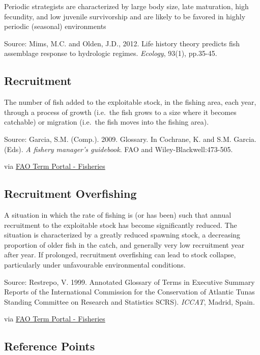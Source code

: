 \documentclass[
  11pt,
]{book}
\begin{document}
Periodic strategists are characterized by large body size, late maturation, high fecundity, and low juvenile survivorship and are likely to be favored in highly periodic (seasonal) environments

Source: Mims, M.C. and Olden, J.D., 2012. Life history theory predicts fish assemblage response to hydrologic regimes. \emph{Ecology}, 93(1), pp.35-45.

\hypertarget{recruitment}{%
\subsection{Recruitment}\label{recruitment}}

The number of fish added to the exploitable stock, in the fishing area, each year, through a process of growth (i.e.~the fish grows to a size where it becomes catchable) or migration (i.e.~the fish moves into the fishing area).

Source: Garcia, S.M. (Comp.). 2009. Glossary. In Cochrane, K. and S.M. Garcia. (Eds). \emph{A fishery manager's guidebook}. FAO and Wiley-Blackwell:473-505.

via \href{http://www.fao.org/fishery/glossary/en}{FAO Term Portal - Fisheries}

\hypertarget{recruitment-overfishing}{%
\subsection{Recruitment Overfishing}\label{recruitment-overfishing}}

A situation in which the rate of fishing is (or has been) such that annual recruitment to the exploitable stock has become significantly reduced. The situation is characterized by a greatly reduced spawning stock, a decreasing proportion of older fish in the catch, and generally very low recruitment year after year. If prolonged, recruitment overfishing can lead to stock collapse, particularly under unfavourable environmental conditions.

Source: Restrepo, V. 1999. Annotated Glossary of Terms in Executive Summary Reports of the International Commission for the Conservation of Atlantic Tunas Standing Committee on Research and Statistics SCRS). \emph{ICCAT}, Madrid, Spain.

via \href{http://www.fao.org/fishery/glossary/en}{FAO Term Portal - Fisheries}

\hypertarget{reference-points}{%
\subsection{Reference Points}\label{reference-points}}
\end{document}
